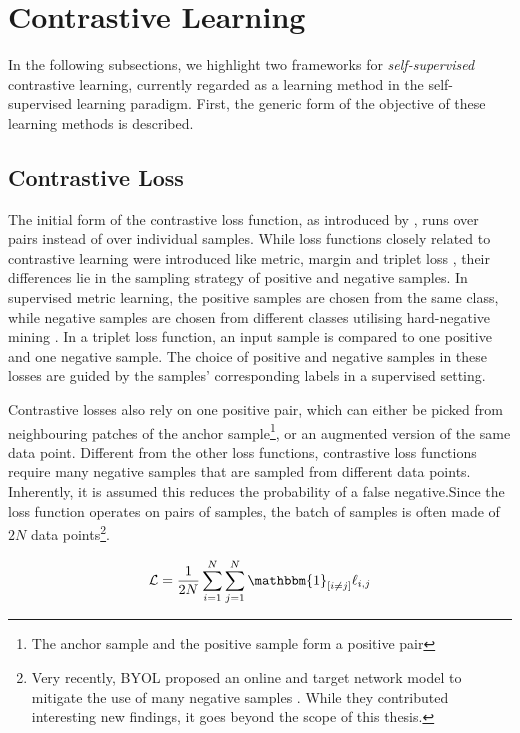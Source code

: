 \section{Contrastive Learning}
In the following subsections, we highlight two frameworks for \textit{self-supervised} contrastive learning, currently regarded as a learning method in the self-supervised learning paradigm.
First, the generic form of the objective of these learning methods is described.


\subsection{Contrastive Loss}
The initial form of the contrastive loss function, as introduced by \cite{contrastiveloss}, runs over pairs instead of over individual samples.
While loss functions closely related to contrastive learning were introduced like metric, margin and triplet loss \cite{8014803, marginloss, chechik_large_2009}, their differences lie in the sampling strategy of positive and negative samples.
In supervised metric learning, the positive samples are chosen from the same class, while negative samples are chosen from different classes utilising hard-negative mining \cite{8014803}.
In a triplet loss function, an input sample is compared to one positive and one negative sample.
The choice of positive and negative samples in these losses are guided by the samples' corresponding labels in a supervised setting.


Contrastive losses also rely on one positive pair, which can either be picked from neighbouring patches of the anchor sample\footnote{The anchor sample and the positive sample form a positive pair}, or an augmented version of the same data point.
Different from the other loss functions, contrastive loss functions require many negative samples that are sampled from different data points.
Inherently, it is assumed this reduces the probability of a false negative.Since the loss function operates on pairs of samples, the batch of samples is often made of $2N$ data points\footnote{Very recently, BYOL proposed an online and target network model to mitigate the use of many negative samples \cite{Grill2020BootstrapYO}.
While they contributed interesting new findings, it goes beyond the scope of this thesis.}.


\begin{equation}
    \mathcal{L} = \frac{1}{2N}\sum_{i=1}^{N}\sum_{j=1}^{N} \mathbbm{1}_{[i\neq j]}\ell_{i, j}
    \label{eq:total_loss_function}
\end{equation}


